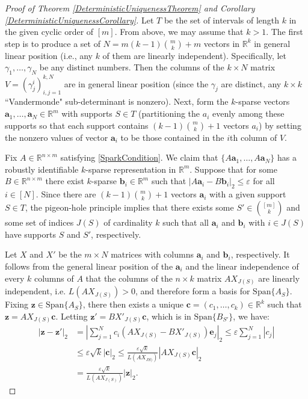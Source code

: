 \documentclass[journal, twocolumn]{IEEEtran}
\begin{document}
\begin{proof}[Proof of Theorem \ref{DeterministicUniquenessTheorem} and Corollary \ref{DeterministicUniquenessCorollary}]
Let $T$ be the set of intervals of length $k$ in the given cyclic order of $[m]$.  From above, we may assume that $k > 1$. The first step is to produce a set of $N = m(k-1){m \choose k}+m$ vectors in $\mathbb{R}^k$ in general linear position (i.e., any $k$ of them are linearly independent). Specifically, let $\gamma_1, \ldots, \gamma_N$ be any distinct numbers. Then the columns of the $k \times N$ matrix $V = (\gamma^i_j)^{k,N}_{i,j=1}$ are in general linear position (since the $\gamma_j$ are distinct, any $k \times k$ ``Vandermonde" sub-determinant is nonzero). Next, form the $k$-sparse vectors $\mathbf{a}_1, \ldots, \mathbf{a}_N \in \mathbb{R}^m$ with supports $S \in T$ (partitioning the $a_i$ evenly among these supports so that each support contains $(k-1){m \choose k}+1$ vectors $a_i$) by setting the nonzero values of vector $\mathbf{a}_i$ to be those contained in the $i$th column of $V$.

Fix $A \in \mathbb{R}^{n \times m}$ satisfying \eqref{SparkCondition}. We claim that $\{A\mathbf{a}_1, \ldots, A\mathbf{a}_N\}$ has a robustly identifiable $k$-sparse representation in $\mathbb{R}^m$. Suppose that for some $B \in \mathbb{R}^{n \times m}$ there exist $k$-sparse $\mathbf{b}_i \in \mathbb{R}^m$ such that $|A\mathbf{a}_i - B\mathbf{b}_i|_2 \leq \varepsilon$ for all $i \in [N]$. Since there are $(k-1){m \choose k}+1$ vectors $\mathbf{a}_i$ with a given support $S \in T$, the pigeon-hole principle implies that there exists some $S' \in {[m] \choose k}$ and some set of indices $J(S)$ of cardinality $k$ such that all $\mathbf{a}_i$ and $\mathbf{b}_i$ with $i \in J(S)$ have supports $S$ and $S'$, respectively.

Let $X$ and $X'$ be the $m \times N$ matrices with columns $\mathbf{a}_i$ and $\mathbf{b}_i$, respectively. It follows from the general linear position of the $\mathbf{a}_i$ and the linear independence of every $k$ columns of $A$ that the columns of the $n \times k$ matrix $AX_{J(S)}$ are linearly independent, i.e. $L(AX_{J(S)}) > 0$, and therefore form a basis for $\text{Span}\{A_{S}\}$. Fixing $\mathbf{z} \in \text{Span}\{A_{S}\}$, there then exists a unique $\mathbf{c} = (c_1, \ldots, c_k) \in \mathbb{R}^k$ such that $\mathbf{z} = AX_{J(S)}\mathbf{c}$. Letting $\mathbf{z'} = BX'_{J(S)}\mathbf{c}$, which is in $\text{Span}\{B_{S'}\}$, we have:
\begin{align*}
|\mathbf{z} - \mathbf{z'}|_2 
&= |\sum_{j=1}^N c_i(AX_{J(S)} - BX'_{J(S)})\mathbf{e}_j|_2 
\leq \varepsilon \sum_{j=1}^N |c_j| \\
&\leq \varepsilon \sqrt{k}  |\mathbf{c}|_2 
\leq \frac{\varepsilon \sqrt{k}}{L(AX_{JS)})} |AX_{J(S)}\mathbf{c}|_2 \\
&= \frac{\varepsilon \sqrt{k}}{L(AX_{J(S)})} |\mathbf{z}|_2.
\end{align*}


\end{proof}
\end{document}
